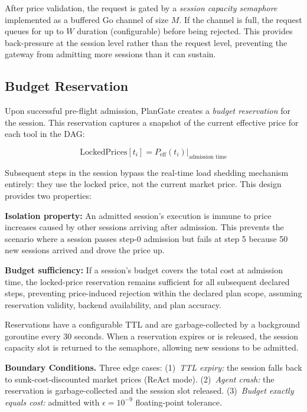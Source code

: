 \documentclass[sigconf,review,anonymous]{acmart}
\begin{document}
After price validation, the request is gated by a \emph{session capacity semaphore} implemented as a buffered Go channel of size $M$. If the channel is full, the request queues for up to $W$ duration (configurable) before being rejected. This provides back-pressure at the session level rather than the request level, preventing the gateway from admitting more sessions than it can sustain.


\subsection{Budget Reservation}
\label{sec:budget}

Upon successful pre-flight admission, PlanGate creates a \emph{budget reservation} for the session. This reservation captures a snapshot of the current effective price for each tool in the DAG:

\begin{equation}
\text{LockedPrices}[t_i] = P_{\text{eff}}(t_i) \big|_{\text{admission time}}
\end{equation}

Subsequent steps in the session bypass the real-time load shedding mechanism entirely: they use the locked price, not the current market price. This design provides two properties:


\noindent\textbf{Isolation property:} An admitted session's execution is immune to price increases caused by other sessions arriving after admission. This prevents the scenario where a session passes step-0 admission but fails at step 5 because 50 new sessions arrived and drove the price up.

\noindent\textbf{Budget sufficiency:} If a session's budget covers the total cost at admission time, the locked-price reservation remains sufficient for all subsequent declared steps, preventing price-induced rejection within the declared plan scope, assuming reservation validity, backend availability, and plan accuracy.


Reservations have a configurable TTL and are garbage-collected by a background goroutine every 30 seconds. When a reservation expires or is released, the session capacity slot is returned to the semaphore, allowing new sessions to be admitted.

\textbf{Boundary Conditions.}
Three edge cases: (1)~\emph{TTL expiry:} the session falls back to sunk-cost-discounted market prices (ReAct mode). (2)~\emph{Agent crash:} the reservation is garbage-collected and the session slot released. (3)~\emph{Budget exactly equals cost:} admitted with $\epsilon{=}10^{-9}$ floating-point tolerance.
\end{document}
